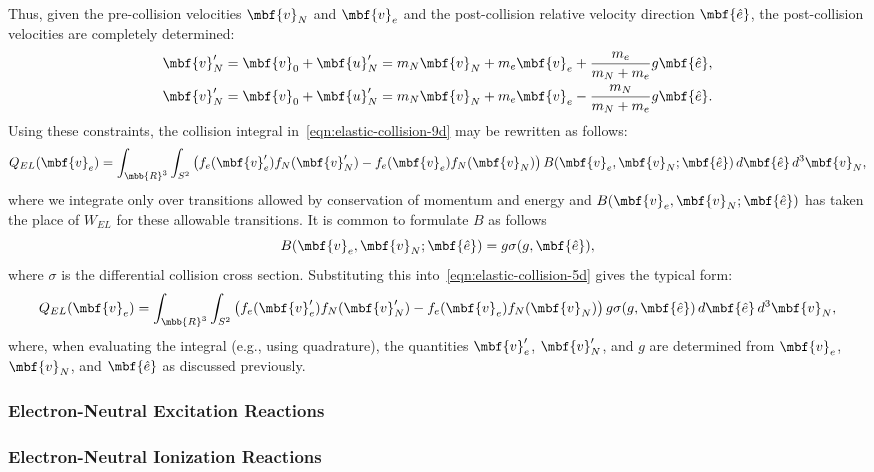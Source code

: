 Thus, given the pre-collision velocities $\mbf{v}_N$ and $\mbf{v}_e$
and the post-collision relative velocity direction $\mbf{\hat{e}}$,
the post-collision velocities are completely determined:
%
\begin{gather*}
\mbf{v}_N^{\prime}
=
\mbf{v}_0 + \mbf{u}_N^{\prime}
=
m_N \mbf{v}_N + m_e \mbf{v}_e + \frac{m_e}{m_N+m_e} g \mbf{\hat{e}},\\
%
\mbf{v}_N^{\prime}
=
\mbf{v}_0 + \mbf{u}_N^{\prime}
=
m_N \mbf{v}_N + m_e \mbf{v}_e - \frac{m_N}{m_N+m_e} g \mbf{\hat{e}}.
\end{gather*}
%
Using these constraints, the collision integral
in~\eqref{eqn:elastic-collision-9d} may be rewritten as follows:
%
\begin{equation}
Q_{EL}(\mbf{v}_e)
=
\int_{\mbb{R}^3} \int_{S^2}
\left(
f_e(\mbf{v}_e^{\prime}) f_N(\mbf{v}_N^{\prime})
-
f_e(\mbf{v}_e) f_N(\mbf{v}_N)
\right) B(\mbf{v}_e, \mbf{v}_N; \mbf{\hat{e}})
\,
d\mbf{\hat{e}} \, d^3\mbf{v}_N,
\label{eqn:elastic-collision-5d}
\end{equation}
%
where we integrate only over transitions allowed by conservation of
momentum and energy and $B(\mbf{v}_e, \mbf{v}_N; \mbf{\hat{e}})$ has
taken the place of $W_{EL}$ for these allowable transitions.  It is
common to formulate $B$ as follows
%
\begin{equation*}
B(\mbf{v}_e, \mbf{v}_N; \mbf{\hat{e}}) = g \sigma(g,\mbf{\hat{e}}),
\end{equation*}
%
where $\sigma$ is the differential collision cross section.
Substituting this into~\eqref{eqn:elastic-collision-5d} gives the
typical form:
%
\begin{equation}
Q_{EL}(\mbf{v}_e)
=
\int_{\mbb{R}^3} \int_{S^2}
\left(
f_e(\mbf{v}_e^{\prime}) f_N(\mbf{v}_N^{\prime})
-
f_e(\mbf{v}_e) f_N(\mbf{v}_N)
\right) g \sigma(g, \mbf{\hat{e}})
\,
d\mbf{\hat{e}} \, d^3\mbf{v}_N,
\label{eqn:elastic-collision-5d}
\end{equation}
%
where, when evaluating the integral (e.g., using quadrature), the
quantities $\mbf{v}_e^{\prime}$, $\mbf{v}_N^{\prime}$, and $g$ are
determined from $\mbf{v}_e$, $\mbf{v}_N$, and $\mbf{\hat{e}}$ as
discussed previously.



\subsubsection{Electron-Neutral Excitation Reactions}


\subsubsection{Electron-Neutral Ionization Reactions}

